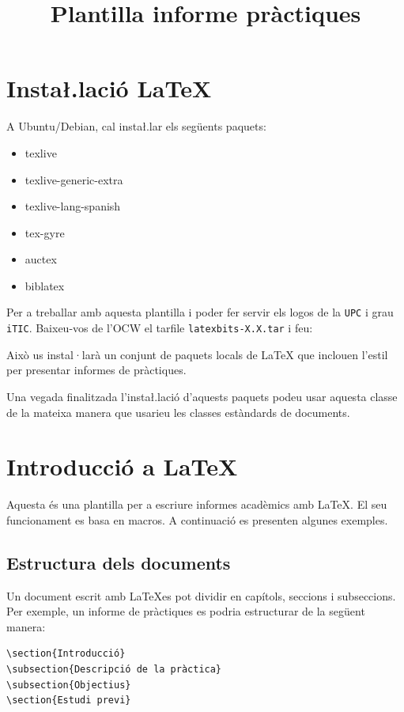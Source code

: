 \documentclass[informe]{practicaitic}
\title{Plantilla informe pràctiques}           %
\begin{document}
\section{Insta\l.lació LaTeX}

A Ubuntu/Debian, cal insta\l.lar els següents paquets:

\begin{itemize}
\item texlive
\item texlive-generic-extra
\item texlive-lang-spanish
\item tex-gyre
\item auctex
\item biblatex
\end{itemize}

Per a treballar amb aquesta plantilla i poder fer servir els logos de
la \texttt{UPC} i grau \texttt{iTIC}. Baixeu-vos de l'OCW el tarfile
\texttt{latexbits-X.X.tar} i feu:


Això us instal·larà un conjunt de paquets locals de \LaTeX{} que
inclouen l'estil per presentar informes de pràctiques.

Una vegada finalitzada l'insta\l.lació d'aquests paquets podeu usar
aquesta classe de la mateixa manera que usarieu les classes
estàndards de documents.


\section{Introducció a LaTeX}

Aquesta és una plantilla per a escriure informes acadèmics amb
\LaTeX. El seu funcionament es basa en macros. A continuació es
presenten algunes exemples.

\subsection{Estructura dels documents}

Un document escrit amb \LaTeX es pot dividir en capítols, seccions i
subseccions. Per exemple, un informe de pràctiques es podria
estructurar de la següent manera:

\begin{verbatim}
\section{Introducció}
\subsection{Descripció de la pràctica}
\subsection{Objectius}
\section{Estudi previ}
\end{verbatim}
\end{document}
